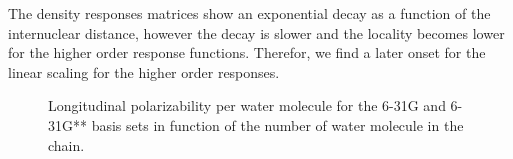 \documentclass[twocolumn,showpacs,preprintnumbers,amsmath,amssymb]{revtex4}
\begin{document}
The density responses matrices show an exponential decay as a function
of the internuclear distance, however the decay is slower and the locality
becomes lower for the higher order response functions.
Therefor, we find a later onset for the linear scaling for the higher order
responses.



\begin{figure}[t]
  \caption{\protect
    Longitudinal polarizability per water molecule for 
    the 6-31G and 6-31G** basis sets in function
    of the number of water molecule in the chain.
  }\label{fig:Alpha_All}
\end{figure}
\end{document}
